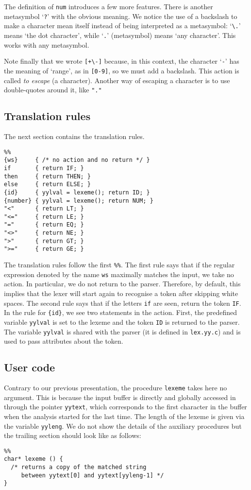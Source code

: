 The definition of \texttt{num} introduces a few more features. There
is another metasymbol `\verb+?+' with the obvious meaning. We notice
the use of a backslash to make a character mean itself instead of
being interpreted as a metasymbol: `\verb+\.+' means `the dot
character', while `\verb+.+' (metasymbol) means `any character'. This
works with any metasymbol.

Note finally that we wrote \verb|[+\-]| because, in this context, the
character `\verb|-|' has the meaning of `range', as in \verb+[0-9]+,
so we must add a backslash. This action is called \emph{to escape} (a
character). Another way of escaping a character is to use
double-quotes around it, like \verb+"."+

\subsection*{Translation rules}

The next section contains the translation rules.
\begin{verbatim}
%%
{ws}     { /* no action and no return */ }
if       { return IF; }
then     { return THEN; }
else     { return ELSE; }
{id}     { yylval = lexeme(); return ID; }
{number} { yylval = lexeme(); return NUM; }
"<"      { return LT; }
"<="     { return LE; }
"="      { return EQ; }
"<>"     { return NE; }
">"      { return GT; }
">="     { return GE; }
\end{verbatim}
The translation rules follow the first \verb+%%+. The first rule says
that if the regular expression denoted by the name \texttt{ws}
maximally matches the input, we take no action. In particular, we do
not return to the parser. Therefore, by default, this implies that the
lexer will start again to recognise a token after skipping white
spaces. The second rule says that if the letters \texttt{if} are seen,
return the token \texttt{IF}. In the rule for \verb+{id}+, we see two
statements in the action. First, the \Lex predefined variable
\texttt{yylval} is set to the lexeme and the token \texttt{ID} is
returned to the parser. The variable \texttt{yylval} is shared with
the parser (it is defined in \texttt{lex.yy.c}) and is used to pass
attributes about the token.

\subsection*{User code}

Contrary to our previous presentation, the procedure \texttt{lexeme}
takes here no argument. This is because the input buffer is directly
and globally accessed in \Lex through the pointer \texttt{yytext},
which corresponds to the first character in the buffer when the
analysis started for the last time. The length of the lexeme is given
via the variable \texttt{yyleng}. We do not show the details of the
auxiliary procedures but the trailing section should look like as
follows:
\begin{verbatim}
%%
char* lexeme () {
  /* returns a copy of the matched string
     between yytext[0] and yytext[yyleng-1] */
}
\end{verbatim}

